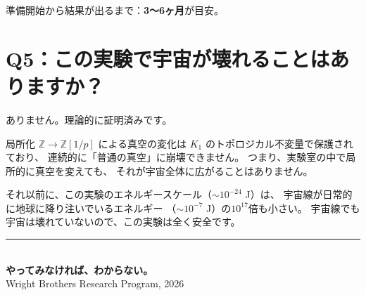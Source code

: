 \documentclass[12pt,a4paper]{article}
\begin{document}
準備開始から結果が出るまで：\textbf{3〜6ヶ月}が目安。

\section*{Q5：この実験で宇宙が壊れることはありますか？}

ありません。理論的に証明済みです。

局所化 $\mathbb{Z} \to \mathbb{Z}[1/p]$ による真空の変化は
$K_1$ のトポロジカル不変量で保護されており、
連続的に「普通の真空」に崩壊できません。
つまり、実験室の中で局所的に真空を変えても、
それが宇宙全体に広がることはありません。

それ以前に、この実験のエネルギースケール（$\sim 10^{-24}$ J）は、
宇宙線が日常的に地球に降り注いでいるエネルギー
（$\sim 10^{-7}$ J）の$10^{17}$倍も小さい。
宇宙線でも宇宙は壊れていないので、この実験は全く安全です。

\vfill
\begin{center}
\rule{8cm}{0.4pt}\\[0.5cm]
{\large\textbf{やってみなければ、わからない。}}\\[0.3cm]
{\small Wright Brothers Research Program, 2026}
\end{center}
\end{document}
